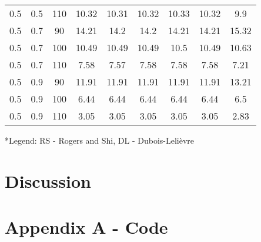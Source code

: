 \documentclass{article}
\begin{document}
\begin{table}[H]
\begin{tabular}{|c|c|c|c|c|c|c|c|c|}
  0.5 & 0.5 & 110 & 10.32 & 10.31 & 10.32 & 10.33 & 10.32 & 9.9 \\
  0.5 & 0.7 & 90 & 14.21 & 14.2 & 14.2 & 14.21 & 14.21 & 15.32 \\
  0.5 & 0.7 & 100 & 10.49 & 10.49 & 10.49 & 10.5 & 10.49 & 10.63 \\
  0.5 & 0.7 & 110 & 7.58 & 7.57 & 7.58 & 7.58 & 7.58 & 7.21 \\
  0.5 & 0.9 & 90 & 11.91 & 11.91 & 11.91 & 11.91 & 11.91 & 13.21 \\
  0.5 & 0.9 & 100 & 6.44 & 6.44 & 6.44 & 6.44 & 6.44 & 6.5 \\
  0.5 & 0.9 & 110 & 3.05 & 3.05 & 3.05 & 3.05 & 3.05 & 2.83 \\
  \hline
  \end{tabular}
\end{table}
\scriptsize
*Legend: RS - Rogers and Shi, DL - Dubois-Leli\`{e}vre
\normalsize

\section{Discussion}

\section{Appendix A - Code}



\end{document}
